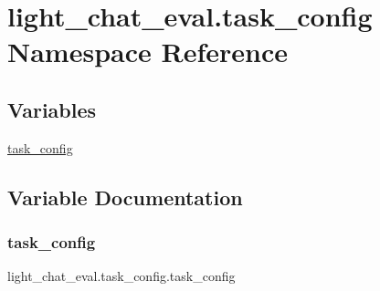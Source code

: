 \hypertarget{namespacelight__chat__eval_1_1task__config}{}\section{light\+\_\+chat\+\_\+eval.\+task\+\_\+config Namespace Reference}
\label{namespacelight__chat__eval_1_1task__config}
\subsection*{Variables}
\begin{DoxyCompactItemize}
\item 
\hyperlink{namespacelight__chat__eval_1_1task__config_ae159492c5eab47f93258df0084d7a6f6}{task\+\_\+config}
\end{DoxyCompactItemize}


\subsection{Variable Documentation}
\mbox{\label{namespacelight__chat__eval_1_1task__config_ae159492c5eab47f93258df0084d7a6f6}} 
\subsubsection{\texorpdfstring{task\+\_\+config}{task\_config}}
{\footnotesize\ttfamily light\+\_\+chat\+\_\+eval.\+task\+\_\+config.\+task\+\_\+config}

